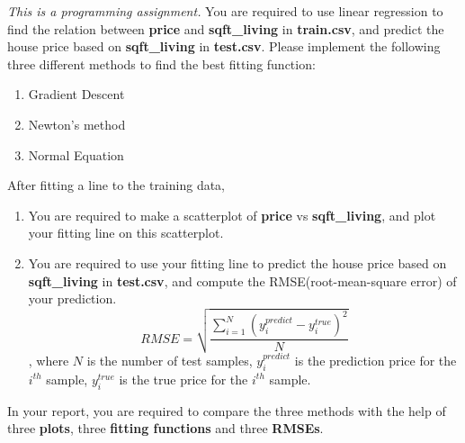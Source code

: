 \documentclass[12pt]{article}
\newenvironment{problem}[2][Problem]{\begin{trivlist}
\item[\hskip \labelsep {\bfseries #1}\hskip \labelsep {\bfseries #2.}]}{\end{trivlist}}
\begin{document}
\begin{problem}{5}
\emph{This is a programming assignment.}
You are required to use linear regression to find the relation between \textbf{price} and \textbf{sqft\_living} in \textbf{train.csv}, and predict the house price based on \textbf{sqft\_living} in \textbf{test.csv}.
Please implement the following three different methods to find the best fitting function:
\begin{enumerate}
\item Gradient Descent
\item Newton's method
\item Normal Equation
\end{enumerate}

After fitting a line to the training data, 
\begin{enumerate}
\item You are required to make a scatterplot of \textbf{price} vs \textbf{sqft\_living}, and plot your fitting line on this scatterplot.
\item You are required to use your fitting line to predict the house price based on \textbf{sqft\_living} in \textbf{test.csv}, and compute the RMSE(root-mean-square error) of your prediction.
\begin{equation}
RMSE = \sqrt{	\frac{\sum_{i=1}^{N} \left(y_{i}^{predict} - y_{i}^{true}\right)^2}{N}}
\end{equation}
, where $N$ is the number of test samples, $y_{i}^{predict}$ is the prediction price for the $i^{th}$ sample, $y_{i}^{true}$ is the true price for the $i^{th}$ sample.
\end{enumerate}

In your report, you are required to compare the three methods with the help of three \textbf{plots}, three \textbf{fitting functions} and three \textbf{RMSEs}.
\end{problem}
\end{document}
